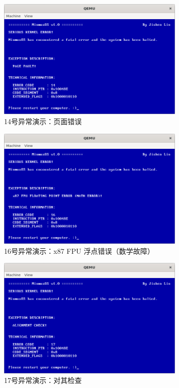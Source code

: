 \begin{figure}[htbp]
    \centering
    \includegraphics[width=0.8\textwidth]{figures/Exception14Presentation.png}
    \caption{14号异常演示：页面错误}
\end{figure}

\begin{figure}[htbp]
    \centering
    \includegraphics[width=0.8\textwidth]{figures/Exception16Presentation.png}
    \caption{16号异常演示：x87 FPU 浮点错误（数学故障）}
\end{figure}

\begin{figure}[htbp]
    \centering
    \includegraphics[width=0.8\textwidth]{figures/Exception17Presentation.png}
    \caption{17号异常演示：对其检查}
\end{figure}

